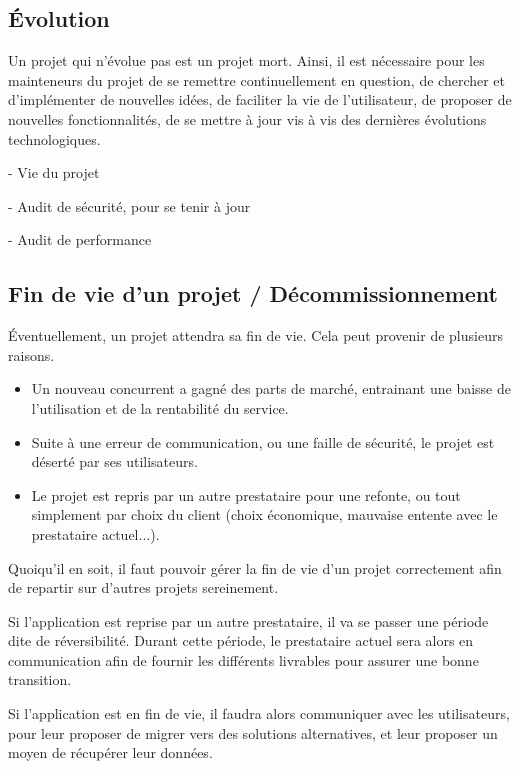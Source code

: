 
\subsection{Évolution}

Un projet qui n'évolue pas est un projet mort. Ainsi, il est nécessaire pour les mainteneurs du projet de se remettre continuellement en question, de chercher et d'implémenter de nouvelles idées, de faciliter la vie de l'utilisateur, de proposer de nouvelles fonctionnalités, de se mettre à jour vis à vis des dernières évolutions technologiques.


- Vie du projet

- Audit de sécurité, pour se tenir à jour

- Audit de performance

\subsection{Fin de vie d'un projet / Décommissionnement}

Éventuellement, un projet attendra sa fin de vie. Cela peut provenir de plusieurs raisons.

\begin{itemize}
	\item Un nouveau concurrent a gagné des parts de marché, entrainant une baisse de l'utilisation et de la rentabilité du service.
	\item Suite à une erreur de communication, ou une faille de sécurité, le projet est déserté par ses utilisateurs.
	\item Le projet est repris par un autre prestataire pour une refonte, ou tout simplement par choix du client (choix économique, mauvaise entente avec le prestataire actuel...).
\end{itemize}

Quoiqu'il en soit, il faut pouvoir gérer la fin de vie d'un projet correctement afin de repartir sur d'autres projets sereinement. 

Si l'application est reprise par un autre prestataire, il va se passer une période dite de réversibilité. Durant cette période, le prestataire actuel sera alors en communication afin de fournir les différents livrables pour assurer une bonne transition. 

Si l'application est en fin de vie, il faudra alors communiquer avec les utilisateurs, pour leur proposer de migrer vers des solutions alternatives, et leur proposer un moyen de récupérer leur données.
